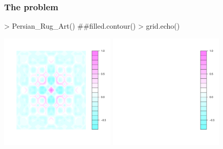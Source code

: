 \documentclass{beamer}
\begin{document}
\begin{frame}[fragile]
\frametitle{The problem}
\begin{Schunk}
\begin{Sinput}
> Persian_Rug_Art() ##filled.contour()
> grid.echo()
\end{Sinput}
\end{Schunk}
\begin{center}
  \includegraphics[height = 5.5cm, width = 5.5cm]{plot/report_fill_1}
  \includegraphics[height = 5.5cm, width = 5.5cm]{plot/report_fill_2}
\end{center}

\end{frame}
\end{document}
